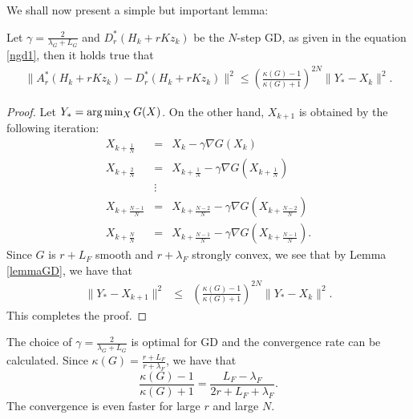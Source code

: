 \begin{itemize}
We shall now present a simple but important lemma: 
\begin{lemma}\label{main:lm} 
Let $\gamma = \frac{2}{\lambda_{G} + L_{G}}$ and $D_r^*(H_k + rKz_k)$ be the $N$-step GD, as given in the equation \eqref{ngd1}, then it holds true that 
\begin{eqnarray*}
\|A_r^*(H_k + rKz_k) - D_r^*(H_k + rKz_k)\|^2 \leq  \left ( \frac{\kappa(G) - 1}{\kappa(G) + 1} \right )^{2N} \|Y_* - X_k\|^2. 
\end{eqnarray*}
\end{lemma}
\begin{proof}
Let $Y_* = {\rm arg} \min_{X} G(X)$. On the other hand, $X_{k+1}$ is obtained by the following iteration: 
\begin{eqnarray*} 
X_{k+\frac{1}{N}} &=& X_{k} - \gamma \nabla G(X_k) \\
X_{k+\frac{2}{N}} &=& X_{k+\frac{1}{N}} - \gamma \nabla G(X_{k+\frac{1}{N}}) \\ 
&\vdots& \\  
X_{k+\frac{N-1}{N}} &=& X_{k+\frac{N-2}{N}} - \gamma \nabla G(X_{k + \frac{N-2}{N}}) \\
X_{k+\frac{N}{N}} &=& 
X_{k+\frac{N-1}{N}} - \gamma \nabla G(X_{k+\frac{N-1}{N}}).  
\end{eqnarray*}
Since $G$ is $r+L_F$ smooth and $r+\lambda_F$ strongly convex, we see that by Lemma \ref{lemmaGD}, we have that 
\begin{eqnarray*}
\|Y_* - X_{k+1}\|^2 &\leq& \left ( \frac{\kappa(G)-1}{\kappa(G)+1} \right )^{2N} \|Y_* - X_k\|^2. 
\end{eqnarray*}
%
This completes the proof. 
\end{proof}
\begin{remark} 
The choice of $\gamma = \frac{2}{\lambda_{G} + L_{G}}$ is optimal for GD and the convergence rate can be calculated. Since $\kappa(G) = \frac{r + L_F}{r + \lambda_F}$, we have that 
\begin{equation}
\frac{\kappa(G)-1}{\kappa(G)+1} = \frac{L_F - \lambda_F}{2r + L_F + \lambda_F}. 
\end{equation}
The convergence is even faster for large $r$ and large $N$.

\end{remark}
\end{itemize}
